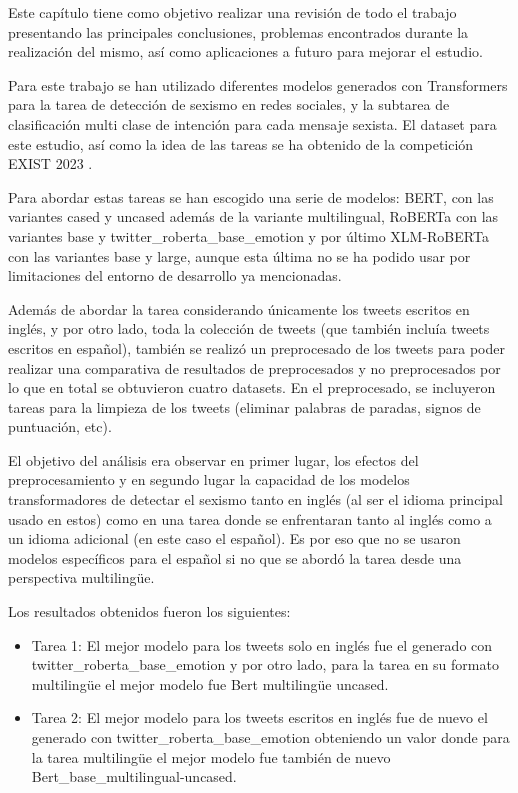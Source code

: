 Este capítulo tiene como objetivo realizar una revisión de todo el trabajo presentando las principales conclusiones, problemas encontrados durante la realización del mismo, así como aplicaciones a futuro para mejorar el estudio.

Para este trabajo se han utilizado diferentes modelos generados con Transformers para la tarea de detección de sexismo en redes sociales, y la subtarea de clasificación multi clase de intención para cada mensaje sexista. El dataset para este estudio, así como la idea de las tareas se ha obtenido de la competición EXIST 2023 \cite{EXIST2023}.

Para abordar estas tareas se han escogido una serie de modelos: BERT, con las variantes cased y uncased además de la variante multilingual, RoBERTa con las variantes base y twitter\_roberta\_base\_emotion y por último XLM-RoBERTa con las variantes base y large, aunque esta última no se ha podido usar por limitaciones del entorno de desarrollo ya mencionadas.

Además de abordar la tarea considerando únicamente los tweets escritos en inglés, y por otro lado, toda la colección de tweets (que también incluía tweets escritos en español),  también se realizó un preprocesado de los tweets para poder realizar una comparativa de resultados de preprocesados y no preprocesados por lo que en total se obtuvieron cuatro datasets. En el preprocesado, se incluyeron tareas para la limpieza de los tweets (eliminar palabras de paradas, signos de puntuación, etc). 

El objetivo del análisis era observar en primer lugar, los efectos del preprocesamiento y en segundo lugar la capacidad de los modelos transformadores de detectar el sexismo tanto en inglés (al ser el idioma principal usado en estos) como en una tarea donde se enfrentaran tanto al inglés como a un idioma adicional (en este caso el español). Es por eso que no se usaron modelos específicos para el español si no que se abordó la tarea desde una perspectiva multilingüe.

Los resultados obtenidos fueron los siguientes:

\begin{itemize}
    \item Tarea 1: El mejor modelo para los tweets solo en inglés fue el generado con twitter\_roberta\_base\_emotion y por otro lado, para la tarea en su formato multilingüe el mejor modelo fue Bert multilingüe uncased.
    \item Tarea 2: El mejor modelo para los tweets escritos en inglés fue de nuevo el generado con twitter\_roberta\_base\_emotion obteniendo un valor donde para la tarea multilingüe el mejor modelo fue también de nuevo Bert\_base\_multilingual-uncased.
\end{itemize}

